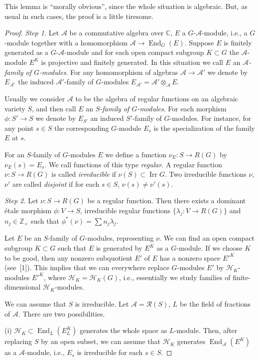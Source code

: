\documentclass[12pt,a4paper]{article}
\theoremstyle{plain}
\theoremstyle{definition}
\theoremstyle{remark}
\DeclareMathOperator{\Irr}{Irr}
\DeclareMathOperator{\End}{End}
\newcommand{\cH}{\mathscr{H}}
\newcommand{\cA}{\mathscr{A}}
\newcommand{\cR}{\mathcal{R}}
\newcommand{\bC}{\mathbb{C}}
\newcommand{\bZ}{\mathbb{Z}}
\begin{document}
This lemma is ``morally obvious'', since the whole situation is algebraic. But, as usual in such cases, the proof is a little tiresome.

\begin{proof}
\textit{Step 1.} Let $\cA$ be a commutative algebra over $\bC$, $E$ a $G$-$\cA$-module, i.e., a $G$-module together with a homomorphism $\cA \to \End_G(E)$. Suppose $E$ is finitely generated as a $G$-$\cA$-module and for each open compact subgroup $K \subset G$ the $\cA$-module $E^K$ is projective and finitely generated. In this situation we call $E$ an \emph{$\cA$-family of $G$-modules}. For any homomorphism of algebras $\cA \to \cA'$ we denote by $E_{\cA'}$ the induced $\cA'$-family of $G$-modules $E_{\cA'} = \cA' \otimes_{\cA} E$.

Usually we consider $\cA$ to be the algebra of regular functions on an algebraic variety $S$, and then call $E$ an \emph{$S$-family of $G$-modules}. For each morphism $\phi: S' \to S$ we denote by $E_{S'}$ an induced $S'$-family of $G$-modules. For instance, for any point $s \in S$ the corresponding $G$-module $E_s$ is the specialization of the family $E$ at $s$.

For an $S$-family of $G$-modules $E$ we define a function $\nu_E: S \to R(G)$ by $\nu_E(s) = E_s$. We call functions of this type \emph{regular}. A regular function $\nu: S \to R(G)$ is called \emph{irreducible} if $\nu(S) \subset \Irr G$. Two irreducible functions $\nu$, $\nu'$ are called \emph{disjoint} if for each $s \in S$, $\nu(s) \neq \nu'(s)$.

\textit{Step 2.} Let $\nu: S \to R(G)$ be a regular function. Then there exists a dominant \'etale morphism $\phi: V \to S$, irreducible regular functions $\{\lambda_j: V \to R(G)\}$ and $n_j \in \bZ_+$ such that $\phi^*(\nu) = \sum n_j \lambda_j$.

Let $E$ be an $S$-family of $G$-modules, representing $\nu$. We can find an open compact subgroup $K \subset G$ such that $E$ is generated by $E^K$ as a $G$-module. If we choose $K$ to be good, then any nonzero subquotient $E'$ of $E$ has a nonzero space $E'^K$ (see~[1]). This implies that we can everywhere replace $G$-modules $E'$ by $\cH_K$-modules $E'^K$, where $\cH_K = \cH_K(G)$, i.e., essentially we study families of finite-dimensional $\cH_K$-modules.

We can assume that $S$ is irreducible. Let $\cA = \cR(S)$, $L$ be the field of fractions of $\cA$. There are two possibilities.

(i) $\cH_K \subset \End_L(E_L^K)$ generates the whole space as $L$-module. Then, after replacing $S$ by an open subset, we can assume that $\cH_K$ generates $\End_{\cA}(E^K)$ as a $\cA$-module, i.e., $E_s$ is irreducible for each $s \in S$.


\end{proof}
\end{document}
